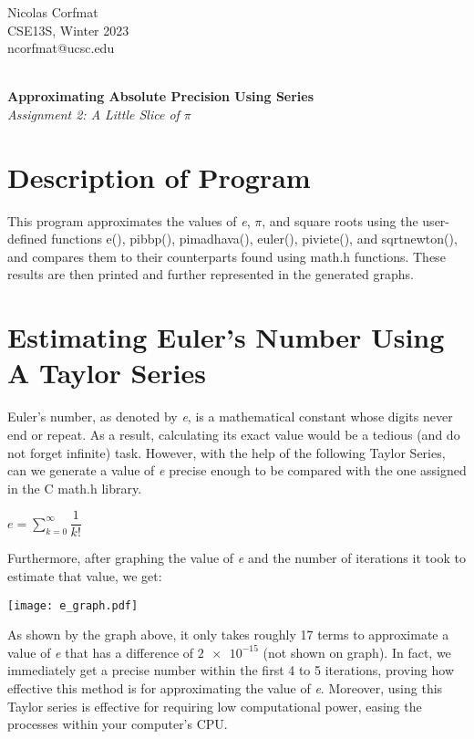 \documentclass[12pt]{article}
\begin{document}
\flushright
Nicolas Corfmat \\CSE13S, Winter 2023 \\ ncorfmat@ucsc.edu

\flushleft
\LARGE
\textbf{\\Approximating Absolute Precision Using Series}
\large
\\\textit{Assignment 2: A Little Slice of $\pi$}

\section{Description of Program}
\normalsize
This program approximates the values of \textit{e}, \textit{$\pi$}, and square roots using the user-defined functions e(), pi\textunderscore bbp(), pi\textunderscore madhava(), euler(), pi\textunderscore viete(), and sqrt\textunderscore newton(), and compares them to their counterparts found using math.h functions. These results are then printed and further represented in the generated graphs.

\section{Estimating Euler's Number Using A Taylor Series}

\normalsize
Euler's number, as denoted by \textit{e}, is a mathematical constant whose digits never end or repeat. As a result, calculating its exact value would be a tedious (and do not forget infinite) task. However, with the help of the following Taylor Series, can we generate a value of \textit{e} precise enough to be compared with the one assigned in the C math.h library.

\centering
$
\textit{e} = \sum^{\infty}_{k=0}{\dfrac{1}{k!}}
$
\flushleft

Furthermore, after graphing the value of \textit{e} and the number of iterations it took to estimate that value, we get:

\texttt{[image: e\_graph.pdf]}

As shown by the graph above, it only takes roughly 17 terms to approximate a value of \textit{e} that has a difference of $\num{2e-15}$ (not shown on graph). In fact, we immediately get a precise number within the first 4 to 5 iterations, proving how effective this method is for approximating the value of \textit{e}. Moreover, using this Taylor series is effective for requiring low computational power, easing the processes within your computer's CPU.
\end{document}
